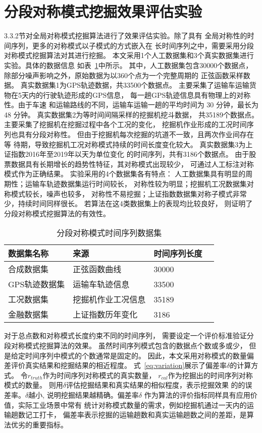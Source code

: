 \section{分段对称模式挖掘效果评估实验}
3.3.2节对全局对称模式挖掘算法进行了效果评估实验。除了具有
全局对称性的时间序列，更多的对称模式以子模式的方式嵌入在
长时间序列之中，需要采用分段对称模式挖掘算法对其进行挖掘。
本文采用1个人工数据集和3个真实数据集进行实验。具体的数据信息
如表~\ref{tab:segment_dataset}中所示。
其中，人工数据集包含30000个数据点，
除部分噪声影响之外，原始数据为以360个点为一个完整周期的
正弦函数采样数据。
真实数据集1为GPS轨迹数据，共33500个数据点。
主要采集了运输车运输货物在5天内的行驶轨迹形成的GPS信息，
每一趟GPS轨迹信息具有物理上的对称性。由于车速
和运输路线的不同，运输车运输一趟的平均时间为 30 分钟，最长为 48 分钟。
真实数据集2为等时间间隔采样的挖掘机挖斗数据，
共35189个数据点。
主要采集了挖掘机在挖掘过程中各个工况的变化，
挖掘机作业形成的工况时间序列也具有分段对称性。
但由于挖掘机每次挖掘的坑道不一致，且两次作业间存在等
待期，导致挖掘机工况对称模式持续的时间长度变化较大。
真实数据集3为上证指数2016年至2019年以天为单位变化
的时间序列，共有3186个数据点。
由于股票数据具有长期增长的趋势性特征，其对称模式出现较少，
可通过人工标注对称模式作为正确结果。
实验采用的4个数据集各有特点：
人工数据集具有明显的周期性；运输车轨迹数据集运行时间较长，
对称性较为明显；挖掘机工况数据集对称模式较长，噪声也较多，
对称性不易挖掘；上证指数数据集对称子模式非常少，持续时间同样很长。
若算法在这4类数据集上的表现均比较良好，
则证明了分段对称模式挖掘算法的有效性。

\begin{table}
  \centering
  \caption{分段对称模式时间序列数据集}
  \begin{tabular}{llll}
    \toprule
    数据集名称       & 来源                   & 时间序列长度  \\
    \midrule
    合成数据集       & 正弦函数曲线           & 30000               \\
    GPS轨迹数据集 & 运输车轨迹信息       & 33500              \\
    工况数据集 & 挖掘机作业工况信息 & 35189              \\
    金融数据集       & 上证指数历年变化       & 3186               \\
    \bottomrule
  \end{tabular}
  \label{tab:segment_dataset}
\end{table}

对于总点数和对称模式长度约束不同的时间序列，
需要设定一个评价标准验证分段对称模式挖掘算法的效果。
虽然时间序列模式包含的数据点个数或多或少，
但是给定时间序列中模式的个数通常是固定的。
因此，本文采用对称模式的数量偏差评价真实结果和挖掘结果的相近程度。
式~\ref{eq:variation}展示了偏差率$\delta$的计算方式。
令$r_{truth}$作为时间序列对称模式的真实数量，
$r_{cal}$作为挖掘出的时间序列对称模式的数量。
则用$\delta$评估挖掘结果和真实结果的相似程度，表示挖掘效果
的的误差率。$\delta$越小, 说明挖掘结果越精确。偏差率$\delta$
作为算法的评价指标同样具有应用价值，实际工业场景中常有
统计对称模式数量的需求，例如挖掘机通过一天内的运输趟数记工打卡，
偏差率表示挖掘的运输趟数和真实运输趟数之间的差距，是算法优劣的重要指标。

